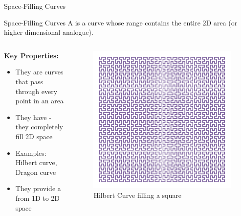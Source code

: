 \begin{frame}{Space-Filling Curves}
  \small
  \begin{conceptbox}{Space-Filling Curves}
    A  is a curve whose range contains the entire 2D area (or higher dimensional analogue).
  \end{conceptbox}

  \vspace{0.3cm}

  \begin{columns}
    \begin{column}{0.6\textwidth}
      \textbf{Key Properties:}
      \begin{itemize}
        \item They are  curves that pass through every point in an area
        \item They have  - they completely fill 2D space
        \item Examples: Hilbert curve, Dragon curve
        \item They provide a  from 1D to 2D space
      \end{itemize}
    \end{column}

    \begin{column}{0.4\textwidth}
      \begin{center}
        \begin{figure}
          \includegraphics[width=\textwidth]{images/hilbert/6.png}
          \caption*{Hilbert Curve filling a square}
        \end{figure}
      \end{center}
    \end{column}
  \end{columns}
\end{frame}

